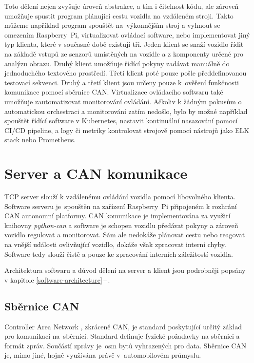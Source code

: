 \documentclass[czech, bachelor]{diploma}
\newcommand{\filipref}[1]{\ref{#1}\,--\,\nameref{#1}}
\begin{document}
Toto dělení nejen zvyšuje úroveň abstrakce, a tím i čitelnost kódu, ale zároveň umožňuje spustit program plánující
cestu vozidla na vzdáleném stroji. Takto můžeme například program spouštět na~výkonnějším stroj a vyhnout se omezením
Raspberry~Pi, virtualizovat ovládací software, nebo implementovat jiný typ klienta, které v současné době existují tři.
Jeden klient se snaží vozidlo řídit na základě vstupů ze senzorů umístěných na vozidle a z komponenty určené pro analýzu obrazu.
Druhý klient umožňuje řídící pokyny zadávat manuálně do jednoduchého textového prostředí. Třetí klient poté pouze pošle
předdefinovanou testovací sekvenci. Druhý a třetí klient jsou určeny pouze k~ověření funkčnosti komunikace pomocí sběrnice CAN.
Virtualizace ovládacího softwaru také umožňuje zautomatizovat monitorování ovládání. Ačkoliv k žádným pokusům o automatickou
orchestraci a monitorování zatím nedošlo, bylo by možné například spouštět řídící software v Kubernetes, nastavit kontinuální
nasazování pomocí CI/CD pipeline, a logy či metriky kontrolovat strojově pomocí nástrojů jako ELK stack nebo Prometheus.

\chapter{Server a CAN komunikace}

TCP server slouží k vzdálenému ovládání vozidla pomocí libovolného klienta. Software serveru je~spouštěn na zařízení Raspberry~Pi
připojeném k rozhrání CAN autonomní platformy. CAN komunikace je implementována za využití knihovny \emph{python-can} a software
je schopen vozidlu předávat pokyny a zároveň vozidlo regulovat a monitorovat. Sám ale nedokáže plánovat cestu nebo reagovat
na vnější události ovlivňující vozidlo, dokáže však zpracovat interní chyby. Software tedy slouží čistě a pouze ke zpracování
interních záležitostí vozidla.

Architektura softwaru a důvod dělení na server a klient jsou podrobněji popsány v kapitole \filipref{software-architecture}.

\section{Sběrnice CAN}

Controller Area Network \cite{can-source}, zkráceně CAN, je standard poskytující určitý základ pro komunikaci na~sběrnici.
Standard definuje fyzické požadavky na sběrnici a formát zpráv. Součástí zprávy je~osm bytů vyhrazených pro data. Sběrnice CAN je,
mimo jiné, hojně využívána právě v~automobilovém průmyslu.
\end{document}
